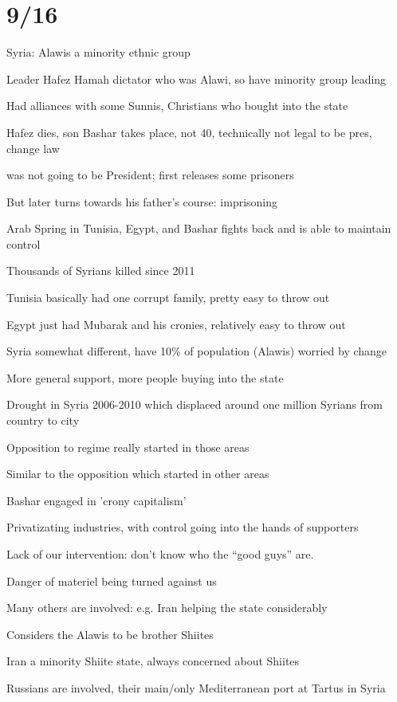 \documentclass[12pt]{article}
\begin{document}
\section{9/16}

Syria: Alawis a minority ethnic group

Leader Hafez Hamah dictator who was Alawi, so have minority group leading

Had alliances with some Sunnis, Christians who bought into the state

Hafez dies, son Bashar takes place, not 40, technically not legal to be pres, change law

was not going to be President; first releases some prisoners

But later turns towards his father's course: imprisoning

Arab Spring in Tunisia, Egypt, and Bashar fights back and is able to maintain control

Thousands of Syrians killed since 2011

Tunisia basically had one corrupt family, pretty easy to throw out

Egypt just had Mubarak and his cronies, relatively easy to throw out

Syria somewhat different, have 10\% of population (Alawis) worried by change

More general support, more people buying into the state

Drought in Syria 2006-2010 which displaced around one million Syrians from country to city

Opposition to regime really started in those areas

Similar to the opposition which started in other areas

Bashar engaged in 'crony capitalism'

Privatizating industries, with control going into the hands of supporters

Lack of our intervention: don't know who the ``good guys'' are.

Danger of materiel being turned against us

Many others are involved: e.g. Iran helping the state considerably

Considers the Alawis to be brother Shiites

Iran a minority Shiite state, always concerned about Shiites

Russians are involved, their main/only Mediterranean port at Tartus in Syria
\end{document}
